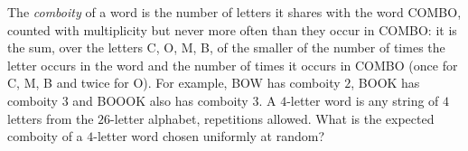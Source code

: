 The \emph{comboity} of a word is the number of letters it shares with the word COMBO, counted with multiplicity but never more often than they occur in COMBO: it is the sum, over the letters C, O, M, B, of the smaller of the number of times the letter occurs in the word and the number of times it occurs in COMBO (once for C, M, B and twice for O). For example, BOW has comboity $2$, BOOK has comboity $3$ and BOOOK also has comboity $3$. A $4$-letter word is any string of $4$ letters from the $26$-letter alphabet, repetitions allowed. What is the expected comboity of a $4$-letter word chosen uniformly at random?
